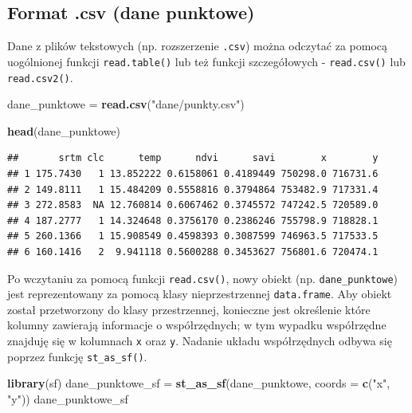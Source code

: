 \documentclass[
  paper=6in:9in,pagesize=pdftex,headinclude=on,footinclude=on,10pt]{scrbook}
\newenvironment{Shaded}{\begin{snugshade}}{\end{snugshade}}
\newcommand{\AttributeTok}[1]{\textcolor[rgb]{0.13,0.29,0.53}{#1}}
\newcommand{\FunctionTok}[1]{\textcolor[rgb]{0.13,0.29,0.53}{\textbf{#1}}}
\newcommand{\NormalTok}[1]{#1}
\newcommand{\OtherTok}[1]{\textcolor[rgb]{0.56,0.35,0.01}{#1}}
\newcommand{\StringTok}[1]{\textcolor[rgb]{0.31,0.60,0.02}{#1}}
\begin{document}
\subsection{Format .csv (dane punktowe)}\label{format-.csv-dane-punktowe}

Dane z plików tekstowych (np. rozszerzenie \texttt{.csv}) można odczytać za pomocą uogólnionej funkcji \texttt{read.table()} lub też funkcji szczegółowych - \texttt{read.csv()} lub \texttt{read.csv2()}.

\begin{Shaded}
\begin{Highlighting}[]
\NormalTok{dane\_punktowe }\OtherTok{=} \FunctionTok{read.csv}\NormalTok{(}\StringTok{"dane/punkty.csv"}\NormalTok{)}
\end{Highlighting}
\end{Shaded}

\begin{Shaded}
\begin{Highlighting}[]
\FunctionTok{head}\NormalTok{(dane\_punktowe)}
\end{Highlighting}
\end{Shaded}

\begin{verbatim}
##       srtm clc      temp      ndvi      savi        x        y
## 1 175.7430   1 13.852222 0.6158061 0.4189449 750298.0 716731.6
## 2 149.8111   1 15.484209 0.5558816 0.3794864 753482.9 717331.4
## 3 272.8583  NA 12.760814 0.6067462 0.3745572 747242.5 720589.0
## 4 187.2777   1 14.324648 0.3756170 0.2386246 755798.9 718828.1
## 5 260.1366   1 15.908549 0.4598393 0.3087599 746963.5 717533.5
## 6 160.1416   2  9.941118 0.5600288 0.3453627 756801.6 720474.1
\end{verbatim}

Po wczytaniu za pomocą funkcji \texttt{read.csv()}, nowy obiekt (np. \texttt{dane\_punktowe}) jest reprezentowany za pomocą klasy nieprzestrzennej \texttt{data.frame}.
Aby obiekt został przetworzony do klasy przestrzennej, konieczne jest określenie które kolumny zawierają informacje o współrzędnych; w tym wypadku współrzędne znajduję się w kolumnach \texttt{x} oraz \texttt{y}.
Nadanie układu współrzędnych odbywa się poprzez funkcję \texttt{st\_as\_sf()}.

\begin{Shaded}
\begin{Highlighting}[]
\FunctionTok{library}\NormalTok{(sf)}
\NormalTok{dane\_punktowe\_sf }\OtherTok{=} \FunctionTok{st\_as\_sf}\NormalTok{(dane\_punktowe, }\AttributeTok{coords =} \FunctionTok{c}\NormalTok{(}\StringTok{"x"}\NormalTok{, }\StringTok{"y"}\NormalTok{))}
\NormalTok{dane\_punktowe\_sf}
\end{Highlighting}
\end{Shaded}
\end{document}
